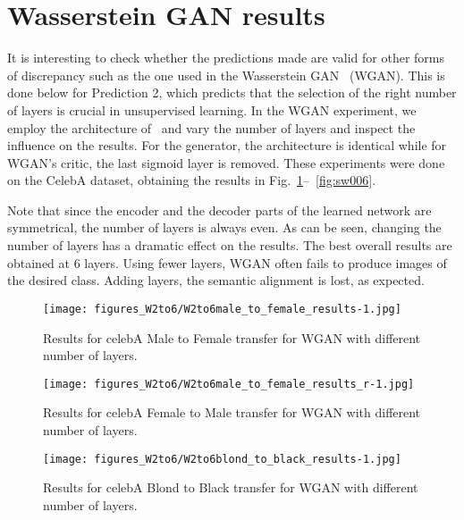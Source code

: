 \documentclass{article} %
\begin{document}
\section{Wasserstein GAN results}
\label{appendix:wgan}

It is interesting to check whether the predictions made are valid for other forms of discrepancy such as the one used in the Wasserstein GAN~\cite{wgan} (WGAN). This is done below for Prediction 2, which predicts that the selection of the right number of layers is crucial in unsupervised learning. 
In the WGAN experiment, we employ the architecture of~\citep{discogan} and vary the number of layers and inspect the influence on the results. For the generator, the architecture is identical while for WGAN's critic, the last sigmoid layer is removed. 
These experiments were done on the CelebA dataset, obtaining the results in Fig.~\ref{fig:sw001}--~\ref{fig:sw006}. 

Note that since the encoder and the decoder parts of the learned network are symmetrical, the number of layers is always even. As can be seen, changing the number of layers has a dramatic effect on the results. The best overall results are obtained at 6 layers. Using fewer layers, WGAN often fails to produce images of the desired class. Adding layers, the semantic alignment is lost, as expected.

\begin{figure}[t]
  \centering
  
 \texttt{[image: figures\_W2to6/W2to6male\_to\_female\_results-1.jpg]}
  \caption{\label{fig:sw001} Results for celebA Male to Female transfer for WGAN with different number of layers. }
\end{figure}

\begin{figure}[t]
  \centering
  
 \texttt{[image: figures\_W2to6/W2to6male\_to\_female\_results\_r-1.jpg]}
  \caption{\label{fig:sw002} Results for celebA Female to Male transfer for WGAN with different number of layers. }
\end{figure}


\begin{figure}[t]
  \centering
  
 \texttt{[image: figures\_W2to6/W2to6blond\_to\_black\_results-1.jpg]}
  \caption{\label{fig:sw003} Results for celebA Blond to Black transfer for WGAN with different number of layers. }
\end{figure}
\end{document}
